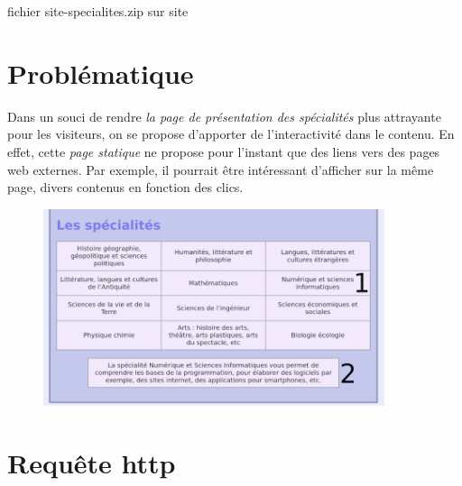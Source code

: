 \documentclass[a4paper,11pt]{article}
\begin{document}
\begin{Form}
\begin{commentprof}
fichier site-specialites.zip sur site
\end{commentprof}
\section{Problématique}
Dans un souci de rendre \emph{la page de présentation des spécialités} plus attrayante pour les visiteurs, on se propose d'apporter de l'interactivité dans le contenu. En effet, cette \emph{page statique} ne propose pour l'instant que des liens vers des pages web externes. Par exemple, il pourrait être intéressant d'afficher sur la même page, divers contenus en fonction des clics.
\begin{figure}[!h]
\centering
\includegraphics[width=10cm]{ressources/problematique-legende.png}
\label{IMG}
\end{figure}
\begin{center}
\end{center}
\section{Requête http}

\end{Form}
\end{document}

